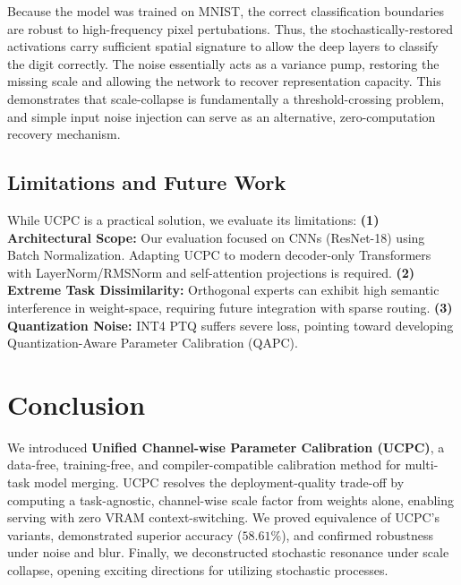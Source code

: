 \documentclass{article}
\theoremstyle{plain}
\theoremstyle{definition}
\theoremstyle{remark}
\begin{document}
Because the model was trained on MNIST, the correct classification boundaries are robust to high-frequency pixel pertubations. Thus, the stochastically-restored activations carry sufficient spatial signature to allow the deep layers to classify the digit correctly. The noise essentially acts as a variance pump, restoring the missing scale and allowing the network to recover representation capacity. This demonstrates that scale-collapse is fundamentally a threshold-crossing problem, and simple input noise injection can serve as an alternative, zero-computation recovery mechanism.

\subsection{Limitations and Future Work}
While UCPC is a practical solution, we evaluate its limitations:
\textbf{(1) Architectural Scope:} Our evaluation focused on CNNs (ResNet-18) using Batch Normalization. Adapting UCPC to modern decoder-only Transformers with LayerNorm/RMSNorm and self-attention projections is required.
\textbf{(2) Extreme Task Dissimilarity:} Orthogonal experts can exhibit high semantic interference in weight-space, requiring future integration with sparse routing.
\textbf{(3) Quantization Noise:} INT4 PTQ suffers severe loss, pointing toward developing Quantization-Aware Parameter Calibration (QAPC).

\section{Conclusion}
\label{sec:conclusion}

We introduced \textbf{Unified Channel-wise Parameter Calibration (UCPC)}, a data-free, training-free, and compiler-compatible calibration method for multi-task model merging. UCPC resolves the deployment-quality trade-off by computing a task-agnostic, channel-wise scale factor from weights alone, enabling serving with zero VRAM context-switching. We proved equivalence of UCPC's variants, demonstrated superior accuracy ($58.61\%$), and confirmed robustness under noise and blur. Finally, we deconstructed stochastic resonance under scale collapse, opening exciting directions for utilizing stochastic processes.



\end{document}
